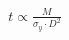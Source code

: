 \documentclass[preview]{standalone}
\begin{document}
\begin{align*}
t \propto \frac{M}{\sigma_y \cdot D^2}
\end{align*}
\end{document}

